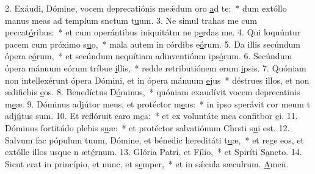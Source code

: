 2. Exáudi, Dómine, vocem deprecatiónis meǽdum oro \uline{a}d te:~* dum extóllo manus meas ad templum snctum t\uline{u}um.
3. Ne simul trahas me cum peccat\uline{ó}ribus:~* et cum operántibus iniquitátm ne p\uline{e}rdas me.
4. Qui loquúntur pacem cum próximo s\uline{u}o,~* mala autem in córdibs e\uline{ó}rum.
5. Da illis secúndum ópera e\uline{ó}rum,~* et secúndum nequítiam adinventiónm ips\uline{ó}rum.
6. Secúndum ópera mánuum eórum tríbue \uline{i}llis,~* redde retributiónem erum \uline{i}psis.
7. Quóniam non intellexérunt ópera Dómini, et in ópera mánuum \uline{e}jus~* déstrues illos, et non ædificbis \uline{e}os.
8. Benedíctus D\uline{ó}minus,~* quóniam exaudívit vocem deprecatinis m\uline{e}æ.
9. Dóminus adjútor meus, et protéctor m\uline{e}us:~* in ipso sperávit cor meum t adj\uline{ú}tus sum.
10. Et reflóruit caro m\uline{e}a:~* et ex voluntáte mea confitbor \uline{e}i.
11. Dóminus fortitúdo plebis s\uline{u}æ:~* et protéctor salvatiónum Chrsti s\uline{u}i est.
12. Salvum fac pópulum tuum, Dómine, et bénedic hereditáti t\uline{u}æ,~* et rege eos, et extólle illos usque n æt\uline{é}rnum.
13. Glória Patri, et F\uline{í}lio,~* et Spiríti S\uline{a}ncto.
14. Sicut erat in princípio, et nunc, et s\uline{e}mper,~* et in sǽcula sæculrum. \uline{A}men.
